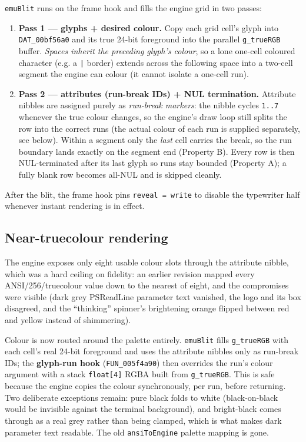 \documentclass[11pt]{article}
\newcommand{\ic}[1]{\texttt{#1}}
\begin{document}
\ic{emuBlit} runs on the frame hook and fills the engine grid in two passes:

\begin{enumerate}[nosep]
  \item \textbf{Pass 1 --- glyphs + desired colour.} Copy each grid cell's glyph into
  \texttt{DAT_00bf56a0} and its true 24-bit foreground into the parallel
  \ic{g_trueRGB} buffer. \emph{Spaces inherit the preceding glyph's colour}, so a lone
  one-cell coloured character (e.g. a \texttt{|} border) extends across the following
  space into a two-cell segment the engine can colour (it cannot isolate a one-cell run).
  \item \textbf{Pass 2 --- attributes (run-break IDs) + NUL termination.} Attribute
  nibbles are assigned purely as \emph{run-break markers}: the nibble cycles
  \texttt{1..7} whenever the true colour changes, so the engine's draw loop still splits
  the row into the correct runs (the actual colour of each run is supplied separately, see
  below). Within a segment only the \emph{last} cell carries the break, so the run
  boundary lands exactly on the segment end (Property B). Every row is then
  NUL-terminated after its last glyph so runs stay bounded (Property A); a fully blank
  row becomes all-NUL and is skipped cleanly.
\end{enumerate}

\noindent
After the blit, the frame hook pins \ic{reveal = write} to disable the typewriter half
whenever instant rendering is in effect.

\subsection{Near-truecolour rendering}
\label{sec:truecolour}

The engine exposes only eight usable colour slots through the attribute nibble, which
was a hard ceiling on fidelity: an earlier revision mapped every ANSI/256/truecolour
value down to the nearest of eight, and the compromises were visible (dark grey
PSReadLine parameter text vanished, the logo and its box disagreed, and the ``thinking''
spinner's brightening orange flipped between red and yellow instead of shimmering).

Colour is now routed around the palette entirely. \ic{emuBlit} fills \ic{g_trueRGB}
with each cell's real 24-bit foreground and uses the attribute nibbles only as run-break
IDs; the \textbf{glyph-run hook} (\texttt{FUN_005f4a90}) then overrides the run's colour
argument with a stack \ic{float[4]} RGBA built from \ic{g_trueRGB}. This is safe because
the engine copies the colour synchronously, per run, before returning. Two deliberate
exceptions remain: pure black folds to white (black-on-black would be invisible against
the terminal background), and bright-black comes through as a real grey rather than
being clamped, which is what makes dark parameter text readable. The old
\ic{ansiToEngine} palette mapping is gone.
\end{document}
